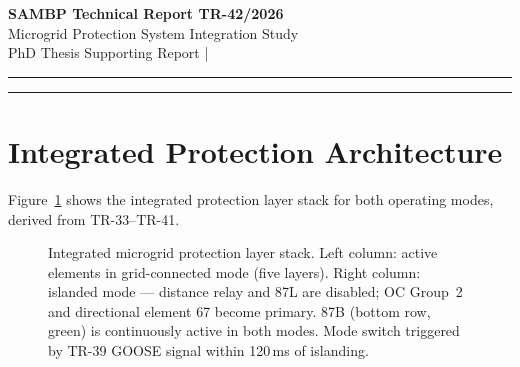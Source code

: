 \documentclass[11pt,a4paper]{article}
\begin{document}
\begin{center}
  {\LARGE\bfseries\color{sambpblue} SAMBP Technical Report TR-42/2026}\\[6pt]
  {\large Microgrid Protection System Integration Study}\\[10pt]
  {\normalsize PhD Thesis Supporting Report \quad|}
\end{center}

\vspace{2pt}\hrule\vspace{8pt}

\begin{abstract}
\noindent
This report performs the integration study for the complete IBR microgrid
protection scheme developed across TR-38--TR-41.  Ten scenarios spanning
grid-connected and islanded modes, internal and external faults, and a range
of $k_\mathrm{ibr}$ values (0.02--0.80\,pu) are evaluated against the
integrated scheme.  Eight of ten scenarios are handled correctly ($P=80\%$);
both misses are structural ($k_\mathrm{ibr}$ below the minimum element
threshold) and cannot be recovered by scheme design.  The grid-connected scheme
alone handles only 5/10 scenarios, confirming that the adaptive microgrid
extensions (adaptive OC, islanding detection, and 87B) provide essential
coverage for islanded operation.  Zero protection gap exists during the mode
transition.  A grid-code recommendation of $k_\mathrm{ibr}\geq0.10$ per
inverter and $k_\mathrm{total}\geq0.20$ for the fleet is derived as the minimum
for full integrated scheme activation.
\end{abstract}

\vspace{4pt}\hrule\vspace{10pt}

\section{Integrated Protection Architecture}
\label{sec:arch}

Figure~\ref{fig:arch} shows the integrated protection layer stack for both
operating modes, derived from TR-33--TR-41.

\begin{figure}[htbp]
  \centering
  \resizebox{0.96\textwidth}{!}{}
  \caption{Integrated microgrid protection layer stack.  Left column: active
           elements in grid-connected mode (five layers).  Right column: islanded
           mode --- distance relay and 87L are disabled; OC Group~2 and directional
           element 67 become primary.  87B (bottom row, green) is continuously
           active in both modes.  Mode switch triggered by TR-39 GOOSE signal
           within 120\,ms of islanding.}
  \label{fig:arch}
\end{figure}
\end{document}
